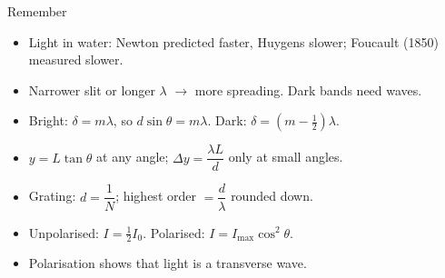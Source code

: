 \begin{summarybox}{Remember}
\begin{itemize}
  \item Light in water: Newton predicted faster, Huygens slower; Foucault (1850) measured slower.
  \item Narrower slit or longer $\lambda$ $\to$ more spreading. Dark bands need waves.
  \item Bright: $\delta = m\lambda$, so $d\sin\theta = m\lambda$. Dark:
        $\delta = \left(m - \frac{1}{2}\right)\lambda$.
  \item $y = L\tan\theta$ at any angle; $\Delta y = \dfrac{\lambda L}{d}$ only at small angles.
  \item Grating: $d = \dfrac{1}{N}$; highest order $= \dfrac{d}{\lambda}$ rounded down.
  \item Unpolarised: $I = \tfrac{1}{2}I_0$. Polarised: $I = I_\mathrm{max}\cos^2\theta$.
  \item Polarisation shows that light is a transverse wave.
\end{itemize}
\end{summarybox}
